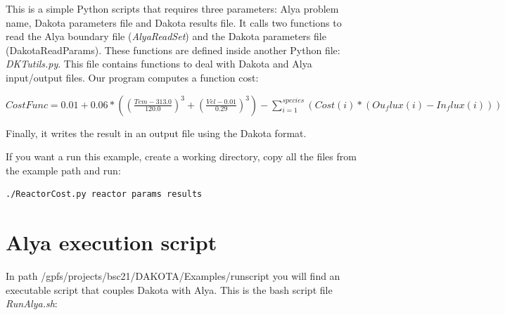 \documentclass[12pt,a4paper,article]{memoir}
\begin{document}
This is a simple Python scripts that requires three parameters: Alya problem name, Dakota parameters file and Dakota results file. It calls two functions to read the Alya boundary file (\textit{AlyaReadSet}) and the Dakota parameters file (DakotaReadParams). These functions are defined inside another Python file: \textit{DKTutils.py}. This file contains functions to deal with Dakota and Alya input/output files. Our program computes a function cost:

$CostFunc=0.01+0.06*((\frac{Tem-313.0}{120.0})^{3}+(\frac{Vel-0.01}{0.29})^{3})-\sum\limits_{i=1}^{species} (Cost(i)*(Ou_flux(i)-In_flux(i)))$

Finally, it writes the result in an output file using the Dakota format.

If you want a run this example, create a working directory, copy all the files from the example path and run:
\begin{lstlisting}[style=MyCodeStyle,language=bash]
./ReactorCost.py reactor params results
\end{lstlisting}

\section{Alya execution script}

In path /gpfs/projects/bsc21/DAKOTA/Examples/runscript you will find an executable script that couples Dakota with Alya. This is the bash script file \textit{RunAlya.sh}:
\end{document}
